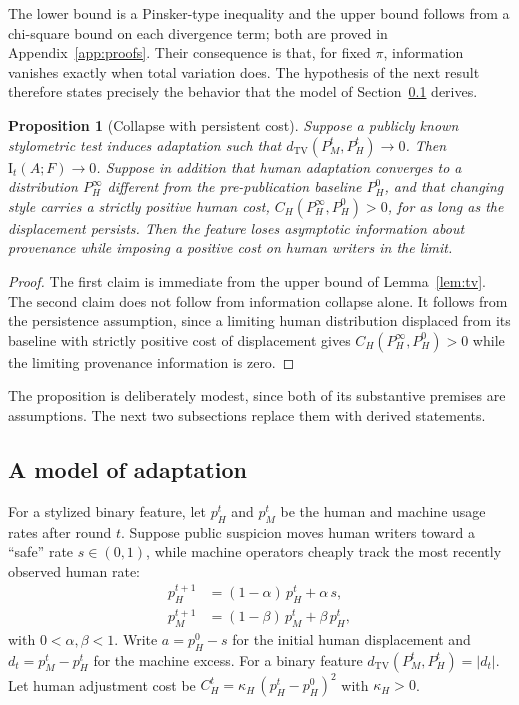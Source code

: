 \documentclass[11pt]{article}
\theoremstyle{plain}
\newtheorem{proposition}{Proposition}
\theoremstyle{definition}
\theoremstyle{remark}
\newcommand{\TV}{d_{\mathrm{TV}}}
\newcommand{\I}{\mathrm{I}}
\begin{document}
The lower bound is a Pinsker-type inequality and the upper bound follows from a chi-square bound on each divergence term; both are proved in Appendix~\ref{app:proofs}. Their consequence is that, for fixed $\pi$, information vanishes exactly when total variation does. The hypothesis of the next result therefore states precisely the behavior that the model of Section~\ref{sec:dynamics} derives.

\begin{proposition}[Collapse with persistent cost]\label{prop:collapse}
Suppose a publicly known stylometric test induces adaptation such that $\TV(P_M^t,P_H^t)\to 0$. Then $\I_t(A;F)\to0$. Suppose in addition that human adaptation converges to a distribution $P_H^\infty$ different from the pre-publication baseline $P_H^0$, and that changing style carries a strictly positive human cost, $C_H(P_H^\infty,P_H^0)>0$, for as long as the displacement persists. Then the feature loses asymptotic information about provenance while imposing a positive cost on human writers in the limit.
\end{proposition}

\begin{proof}
The first claim is immediate from the upper bound of Lemma~\ref{lem:tv}. The second claim does not follow from information collapse alone. It follows from the persistence assumption, since a limiting human distribution displaced from its baseline with strictly positive cost of displacement gives $C_H(P_H^\infty,P_H^0)>0$ while the limiting provenance information is zero.
\end{proof}

The proposition is deliberately modest, since both of its substantive premises are assumptions. The next two subsections replace them with derived statements.

\subsection{A model of adaptation}\label{sec:dynamics}

For a stylized binary feature, let $p_H^t$ and $p_M^t$ be the human and machine usage rates after round $t$. Suppose public suspicion moves human writers toward a ``safe'' rate $s\in(0,1)$, while machine operators cheaply track the most recently observed human rate:
\begin{align}
p_H^{t+1} &= (1-\alpha)\,p_H^t+\alpha\, s,\label{eq:human}\\
p_M^{t+1} &= (1-\beta)\,p_M^t+\beta\, p_H^t,\label{eq:machine}
\end{align}
with $0<\alpha,\beta<1$. Write $a=p_H^0-s$ for the initial human displacement and $d_t=p_M^t-p_H^t$ for the machine excess. For a binary feature $\TV(P_M^t,P_H^t)=|d_t|$. Let human adjustment cost be $C_H^t=\kappa_H\,(p_H^t-p_H^0)^2$ with $\kappa_H>0$.
\end{document}

